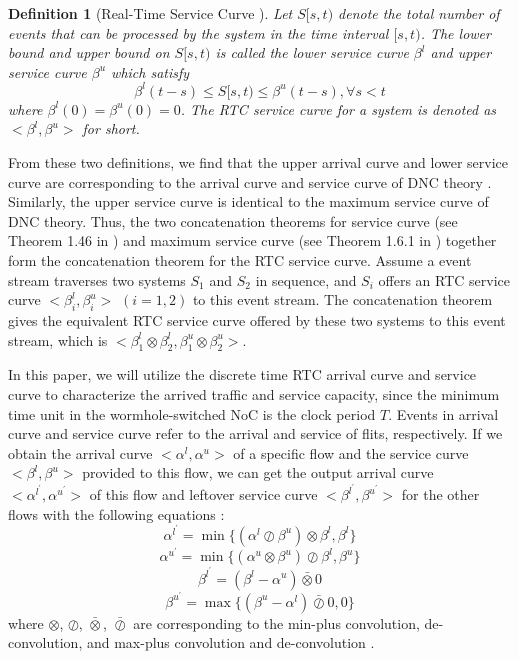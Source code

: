 \documentclass[10pt,journal]{IEEEtran}
\newtheorem{definition}{Definition}
\begin{document}
\begin{definition}[Real-Time Service Curve \cite{1253607}]
Let $S[s,t)$ denote the total number of events that can be processed by the system in the time interval $[s,t)$. The lower bound and upper bound on $S[s,t)$ is called the lower service curve $\beta^l$ and upper service curve $\beta^u$ which satisfy
$$\beta^l(t-s)\leq S[s,t)\leq \beta^u(t-s),\forall s<t$$
where $\beta^l(0)=\beta^u(0)=0$. The RTC service curve for a system is denoted as $<\beta^l,\beta^u>$ for short.
\end{definition}

From these two definitions, we find that the upper arrival curve and lower service curve are corresponding to the arrival curve and service curve of DNC theory \cite{Boudec2001Network}. Similarly, the upper service curve is identical to the maximum service curve of DNC theory. Thus, the two concatenation theorems for service curve (see Theorem 1.46 in \cite{Boudec2001Network}) and maximum service curve (see Theorem 1.6.1 in \cite{Boudec2001Network}) together form the concatenation theorem for the RTC service curve. Assume a event stream traverses two systems $S_1$ and $S_2$ in sequence, and $S_i$ offers an RTC service curve $<\beta^l_i,\beta^u_i>$ $(i=1,2)$ to this event stream. The concatenation theorem gives the equivalent RTC service curve offered by these two systems to this event stream, which is $<\beta^l_1\otimes\beta^l_2,\beta^u_1\otimes\beta^u_2>$.

In this paper, we will utilize the discrete time RTC arrival curve and service curve to characterize the arrived traffic and service capacity, since the minimum time unit in the wormhole-switched NoC is the clock period $T$. Events in arrival curve and service curve refer to the arrival and service of flits, respectively. If we obtain the arrival curve $<\alpha^l,\alpha^u>$ of a specific flow and the service curve $<\beta^l,\beta^u>$ provided to this flow, we can get the output arrival curve $<\alpha^{l^\prime},\alpha^{u^\prime}>$ of this flow and leftover service curve $<\beta^{l^\prime},\beta^{u^\prime}>$ for the other flows with the following equations \cite{1253607}:
\begin{equation}\label{alphal}
\alpha^{l^\prime}=\min\{(\alpha^l\oslash\beta^u)\otimes\beta^l,\beta^l\}
\end{equation}
\begin{equation}\label{alphau}
\alpha^{u^\prime}=\min\{(\alpha^u\otimes\beta^u)\oslash\beta^l,\beta^u\}
\end{equation}
\begin{equation}\label{betal}
\beta^{l^\prime}=(\beta^l-\alpha^u)\bar{\otimes}0
\end{equation}
\begin{equation}\label{betau}
\beta^{u^\prime}=\max\{(\beta^u-\alpha^l)\bar{\oslash}0,0\}
\end{equation}
where $\otimes$, $\oslash$, $\bar{\otimes}$, $\bar{\oslash}$ are corresponding to the min-plus convolution, de-convolution, and max-plus convolution and de-convolution \cite{Boudec2001Network}.
\end{document}
